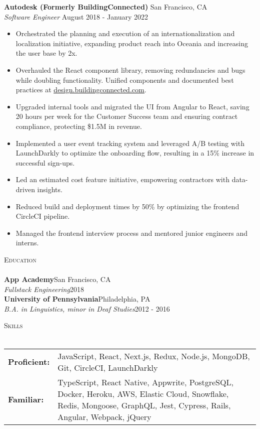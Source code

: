 \documentclass[a4paper]{article}
\newcommand{\header}[1]{
    {\hspace*{-18pt}\vspace*{3pt} \textcolor{deeppurple}{\textsc{#1}}}
    \vspace*{-12pt} \\
    \hspace*{-18pt} \textcolor{deeppurple}{\hrulefill} \\
}
\begin{document}
\textbf{Autodesk (Formerly BuildingConnected)} \hfill San Francisco, CA\\
\textit{Software Engineer} \hfill August 2018 - January 2022\\
\vspace{-1mm}
\begin{itemize} \itemsep .5pt
    \item Orchestrated the planning and execution of an internationalization and localization initiative, expanding product reach into Oceania and increasing the user base by 2x.
    \item Overhauled the React component library, removing redundancies and bugs while doubling functionality. Unified components and documented best practices at \href{https://design.buildingconnected.com/}{\underline{design.buildingconnected.com}}.
    \item Upgraded internal tools and migrated the UI from Angular to React, saving 20 hours per week for the Customer Success team and ensuring contract compliance, protecting \$1.5M in revenue.
    \item Implemented a user event tracking system and leveraged A/B testing with LaunchDarkly to optimize the onboarding flow, resulting in a 15\% increase in successful sign-ups.
    \item Led an estimated cost feature initiative, empowering contractors with data-driven insights.
    \item Reduced build and deployment times by 50\% by optimizing the frontend CircleCI pipeline.
    \item Managed the frontend interview process and mentored junior engineers and interns.
\end{itemize}

\header{Education}
\textbf{App Academy}\hfill San Francisco, CA\\
\textit{Fullstack Engineering}\hfill 2018\\
\vspace{2mm}
\textbf{University of Pennsylvania}\hfill Philadelphia, PA\\
\textit{B.A. in Linguistics, minor in Deaf Studies}\hfill 2012 - 2016\\
\vspace{2mm}

\header{Skills}
\vspace{1mm}
\begin{tabular}{ l p{5.4in} }
    \hspace{-0.08in}\textbf{Proficient:} & JavaScript, React, Next.js, Redux, Node.js, MongoDB, Git, CircleCI, LaunchDarkly \\
    \hspace{-0.08in}\textbf{Familiar:}   & TypeScript, React Native, Appwrite, PostgreSQL, Docker, Heroku, AWS, Elastic Cloud, Snowflake, Redis, Mongoose, GraphQL, Jest, Cypress, Rails, Angular, Webpack, jQuery \\
\end{tabular}
\end{document}
